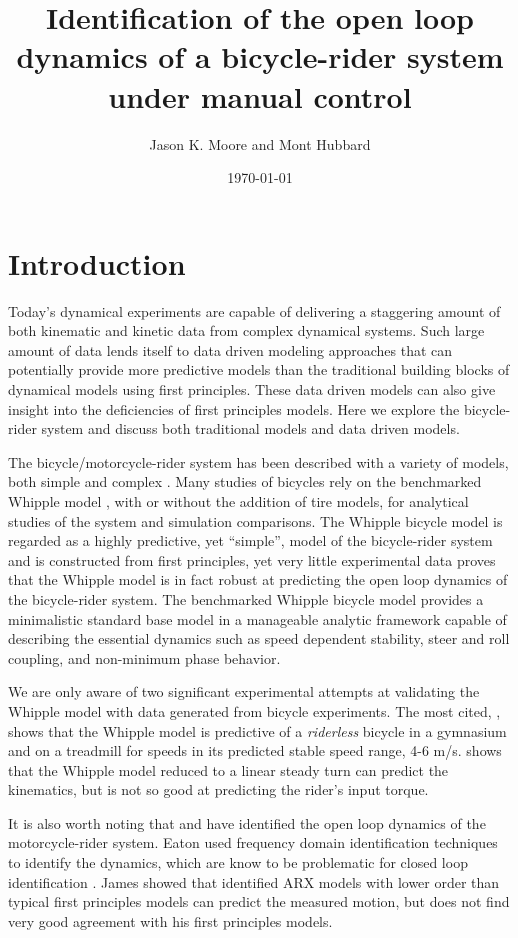 \documentclass[a4paper]{article}
\title{Identification of the open loop dynamics of a bicycle-rider system under
manual control}
\author{Jason K. Moore and Mont Hubbard}
\date{\today}
\begin{document}
\maketitle

\section{Introduction}

Today's dynamical experiments are capable of delivering a staggering amount of
both kinematic and kinetic data from complex dynamical systems. Such large
amount of data lends itself to data driven modeling approaches that can
potentially provide more predictive models than the traditional building blocks
of dynamical models using first principles. These data driven models can also
give insight into the deficiencies of first principles models. Here we explore
the bicycle-rider system and discuss both traditional models and data driven
models.

The bicycle/motorcycle-rider system has been described with a variety of
models, both simple \cite{Timoshenko1948} and complex \cite{Sharp1971}. Many
studies of bicycles rely on the benchmarked Whipple model \cite{Meijaard2007},
with or without the addition of tire models, for analytical studies of the
system and simulation comparisons. The Whipple bicycle model is regarded as a
highly predictive, yet ``simple'', model of the bicycle-rider system and is
constructed from first principles, yet very little experimental data proves
that the Whipple model is in fact robust at predicting the open loop dynamics
of the bicycle-rider system. The benchmarked Whipple bicycle model
\cite{Meijaard2007} provides a minimalistic standard base model in a manageable
analytic framework capable of describing the essential dynamics such as speed
dependent stability, steer and roll coupling, and non-minimum phase behavior.

We are only aware of two significant experimental attempts at validating the
Whipple model with data generated from bicycle experiments. The most cited,
\cite{Kooijman2008,Kooijman2009}, shows that the Whipple model is predictive of
a \emph{riderless} bicycle in a gymnasium and on a treadmill for speeds in its
predicted stable speed range, 4-6 m/s. \cite{Cain2011} shows that the Whipple
model reduced to a linear steady turn can predict the kinematics, but is not so
good at predicting the rider's input torque.

It is also worth noting that \cite{Eaton1973} and \cite{James2002,James2005}
have identified the open loop dynamics of the motorcycle-rider system. Eaton
used frequency domain identification techniques to identify the dynamics, which
are know to be problematic for closed loop identification \cite{Ljung1999}.
James showed that identified ARX models with lower order than typical first
principles models can predict the measured motion, but does not find very good
agreement with his first principles models.
\end{document}
